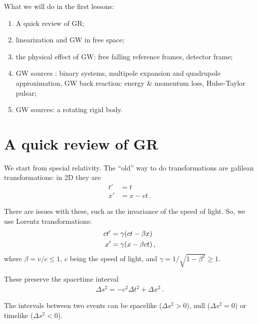 \documentclass[main.tex]{subfiles}
\begin{document}

What we will do in the first lessons: 
\begin{enumerate}
  \item A quick review of GR;
  \item linearization and GW in free space;
  \item the physical effect of GW: free falling reference frames, detector frame;
  \item GW sources : binary systems, multipole expansion and quadrupole approximation, GW back reaction: energy \& momentum loss, Hulse-Taylor pulsar;
  \item GW sources: a rotating rigid body.
\end{enumerate}

\section{A quick review of GR}

We start from special relativity. 
The ``old'' way to do transformations are galilean transformations: in 2D they are
%
\begin{subequations}
\begin{align}
t' &= t  \\
x' &= x - vt
\,.
\end{align}
\end{subequations}

There are issues with these, such as the invariance of the speed of light. So, we use Lorentz transformations: 
%
\begin{subequations}
\begin{align}
ct' &= \gamma \qty(ct - \beta x)  \\
x' &= \gamma \qty(x - \beta ct)
\,,
\end{align}
\end{subequations}
%
where \(\beta = v/c \leq 1\), \(c\) being the speed of light, and \(\gamma = 1/\sqrt{1 - \beta^2} \geq 1\). 

These preserve the spacetime interval 
%
\begin{align}
\Delta s^2 = - c^2 \Delta t^2 + \Delta x^2
\,.
\end{align}

The intervals between two events can be spacelike (\(\Delta s^2 > 0\)), null (\(\Delta s^2 = 0\)) or timelike (\(\Delta s^2 < 0\)). 
\end{document}
